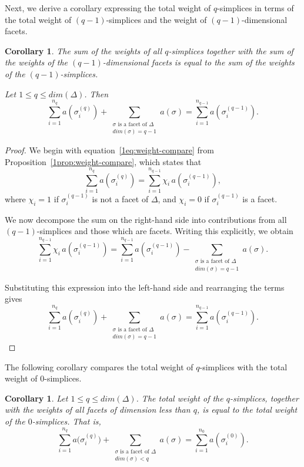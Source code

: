 \documentclass[12pt]{article}
\theoremstyle{normalhead_nobrackets}
\newtheorem{corollary}[theorem]{Corollary}
\theoremstyle{exampstyle}
\begin{document}
Next, we derive a corollary expressing the total weight of $q$-simplices in terms of the total weight of $(q-1)$-simplices and the weight of $(q-1)$-dimensional facets.

\begin{corollary}\label{1cor:weight-compare-facet}
The sum of the weights of all $q$-simplices together with the sum of the weights of the $(q-1)$-dimensional facets is equal to the sum of the weights of the $(q-1)$-simplices.

Let $1 \le q \le dim(\Delta)$. Then
\begin{equation}\label{1eq:weight-compare-facet}
\sum_{i=1}^{n_q} a(\sigma_i^{(q)}) 
+
\sum_{\substack{\sigma \text{ is a facet of } \Delta \\ dim(\sigma) = q-1}} a(\sigma)
=
\sum_{i=1}^{n_{q-1}} a(\sigma_i^{(q-1)}).
\end{equation}
\end{corollary}

\begin{proof}
We begin with equation~\eqref{1eq:weight-compare} from Proposition~\ref{1prop:weight-compare}, which states that
\[
\sum_{i=1}^{n_q} a(\sigma_i^{(q)}) 
= 
\sum_{i=1}^{n_{q-1}} \chi_i \, a(\sigma_i^{(q-1)}),
\]
where $\chi_i = 1$ if $\sigma_i^{(q-1)}$ is not a facet of $\Delta$, and $\chi_i = 0$ if $\sigma_i^{(q-1)}$ is a facet.

We now decompose the sum on the right-hand side into contributions from all $(q-1)$-simplices and those which are facets. Writing this explicitly, we obtain
\[
\sum_{i=1}^{n_{q-1}} \chi_i \, a(\sigma_i^{(q-1)}) 
=
\sum_{i=1}^{n_{q-1}} a(\sigma_i^{(q-1)}) 
-
\sum_{\substack{\sigma \text{ is a facet of } \Delta \\ dim(\sigma)=q-1}} a(\sigma).
\]

Substituting this expression into the left-hand side and rearranging the terms gives
\begin{equation}\label{1eq:weight-compare-facet2}
\sum_{i=1}^{n_q} a(\sigma_i^{(q)}) 
+
\sum_{\substack{\sigma \text{ is a facet of } \Delta \\ dim(\sigma)=q-1}} a(\sigma)
=
\sum_{i=1}^{n_{q-1}} a(\sigma_i^{(q-1)}).
\end{equation}
\end{proof}

The following corollary compares the total weight of $q$-simplices with the total weight of $0$-simplices.

\begin{corollary}\label{1cor:weight-compare-0-q}
Let $1 \le q \le dim(\Delta)$. The total weight of the $q$-simplices, together with the weights of all facets of dimension less than $q$, is equal to the total weight of the $0$-simplices. That is,
\[
\sum_{i=1}^{n_q} a\bigl(\sigma_i^{(q)}\bigr)
+
\sum_{\substack{\sigma \text{ is a facet of } \Delta \\ dim(\sigma) < q}} a(\sigma)
=
\sum_{i=1}^{n_0} a(\sigma_i^{(0)}).
\]
\end{corollary}
\end{document}
